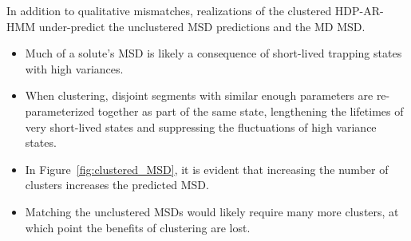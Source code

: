 \documentclass[journal=jpcbfk,manuscript=article]{achemso}
\begin{document}
  In addition to qualitative mismatches, realizations of the clustered HDP-AR-HMM 
  under-predict the unclustered MSD predictions and the MD MSD. 
  \begin{itemize}
    \item Much of a solute's MSD is likely a consequence of short-lived trapping states
    with high variances.
    \item When clustering, disjoint segments with similar enough parameters are
    re-parameterized together as part of the same state, lengthening the lifetimes 
    of very short-lived states and suppressing the fluctuations of high variance states.
    \item In Figure~\ref{fig:clustered_MSD}, it is evident that increasing the number
    of clusters increases the predicted MSD.
    \item Matching the unclustered MSDs would likely require many more clusters, at 
    which point the benefits of clustering are lost. 
  \end{itemize}
  
\end{document}
